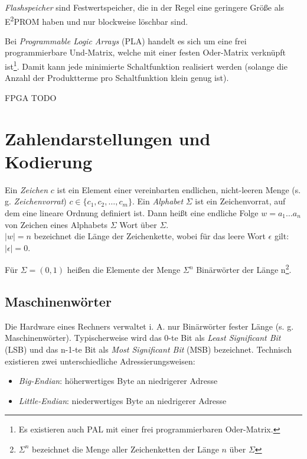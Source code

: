 \documentclass[11pt]{article}
\begin{document}
\textit{Flashspeicher} sind Festwertspeicher, die in der Regel eine geringere Größe als E\textsuperscript{2}PROM haben und nur blockweise löschbar sind.

Bei \textit{Programmable Logic Arrays} (PLA) handelt es sich um eine frei programmierbare Und-Matrix, welche mit einer festen Oder-Matrix verknüpft ist\footnote{Es existieren auch PAL mit einer frei programmierbaren Oder-Matrix.}. Damit kann jede minimierte Schaltfunktion realisiert werden (solange die Anzahl der Produktterme pro Schaltfunktion klein genug ist).

FPGA \large{TODO}

\section{Zahlendarstellungen und Kodierung}
Ein \textit{Zeichen} \(c\) ist ein Element einer vereinbarten endlichen, nicht-leeren Menge (s. g. \textit{Zeichenvorrat}) \(c \in \{c_1,c_2,\dots,c_m\} \). Ein \textit{Alphabet} \(\Sigma\) ist ein Zeichenvorrat, auf dem eine lineare Ordnung definiert ist. Dann heißt eine endliche Folge \(w = a_1 \dots a_n\) von Zeichen eines Alphabets \(\Sigma\) Wort über \(\Sigma\).\\
\(|w| = n\) bezeichnet die Länge der Zeichenkette, wobei für das leere Wort \(\epsilon\) gilt: \(|\epsilon| = 0\).

Für \(\Sigma = (0,1)\) heißen die Elemente der Menge \(\Sigma^n\) Binärwörter der Länge n\footnote{\(\Sigma^n\) bezeichnet die Menge aller Zeichenketten der Länge \(n\) über \(\Sigma\)}.

\subsection{Maschinenwörter}
Die Hardware eines Rechners verwaltet i. A. nur Binärwörter fester Länge (s. g. Maschinenwörter). Typischerweise wird das 0-te Bit als \textit{Least Significant Bit} (LSB) und das n-1-te Bit als \textit{Most Significant Bit} (MSB) bezeichnet. Technisch existieren zwei unterschiedliche Adressierungsweisen:
\begin{itemize}
  \item \textit{Big-Endian}: höherwertiges Byte an niedrigerer Adresse
  \item \textit{Little-Endian}: niederwertiges Byte an niedrigerer Adresse
\end{itemize}
\end{document}
